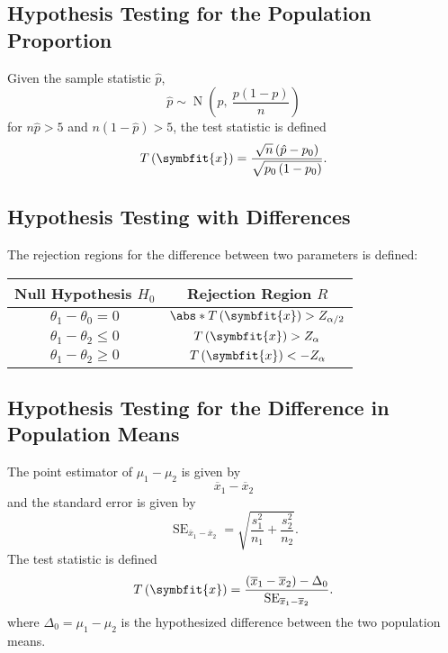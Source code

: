 \documentclass{article}
\begin{document}
\subsection{Hypothesis Testing for the Population Proportion}
Given the sample statistic \(\hat{p}\),
\begin{equation*}
    \hat{p} \sim \operatorname{N}\left( p,\: \frac{p\left( 1 - p \right)}{n} \right)
\end{equation*}
for \(n \hat{p} > 5\) and \(n \left( 1 - \hat{p} \right) > 5\),
the test statistic is defined
\begin{equation*}
    T\left( \symbfit{x} \right) = \frac{\sqrt{n} \left( \hat{p} - p_0 \right)}{\sqrt{p_0 \left( 1 - p_0 \right)}}.
\end{equation*}
\subsection{Hypothesis Testing with Differences}
The rejection regions for the difference between two parameters is defined:
\begin{center}
    \begin{tabular}{cc}
        \toprule
        \textbf{Null Hypothesis} \(H_0\) & \textbf{Rejection Region} \(R\)                       \\
        \midrule
        \(\theta_1 - \theta_0 = 0\)      & \(\abs*{T\left( \symbfit{x} \right)} > Z_{\alpha/2}\) \\
        \(\theta_1 - \theta_2 \leq 0\)   & \(T\left( \symbfit{x} \right) > Z_{\alpha}\)          \\
        \(\theta_1 - \theta_2 \geq 0\)   & \(T\left( \symbfit{x} \right) < -Z_{\alpha}\)         \\
        \bottomrule
    \end{tabular}
\end{center}
\subsection{Hypothesis Testing for the Difference in Population Means}
The point estimator of \(\mu_1 - \mu_2\) is given by
\begin{equation*}
    \overline{x}_1 - \overline{x}_2
\end{equation*}
and the standard error is given by
\begin{equation*}
    \operatorname{SE}_{\overline{x}_1 - \overline{x}_2} = \sqrt{\frac{s_1^2}{n_1} + \frac{s_2^2}{n_2}}.
\end{equation*}
The test statistic is defined
\begin{equation*}
    T\left( \symbfit{x} \right) = \frac{\left( \overline{x}_1 - \overline{x}_2 \right) - \Delta_0}{\operatorname{SE}_{\overline{x}_1 - \overline{x}_2}}.
\end{equation*}
where \(\Delta_0 = \mu_1 - \mu_2\) is the hypothesized difference between the two population means.
\end{document}
